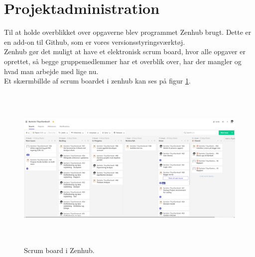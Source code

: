 \section{Projektadministration}
Til at holde overblikket over opgaverne blev programmet Zenhub brugt. Dette er en add-on til Github, som er vores versionsstyringsværktøj. \\
Zenhub gør det muligt at have et elektronisk scrum board, hvor alle opgaver er oprettet, så begge gruppemedlemmer har et overblik over, har der mangler og hvad man arbejde med lige nu. \\
Et skærmbillde af scrum boardet i zenhub kan ses på figur \ref{fig:ZenhubScrum}.

\begin{figure} [H]
	\begin{center}
		\includegraphics[height=8cm, width=15cm]{Projektadministration/Zenhub}
	\end{center}
	\caption{Scrum board i Zenhub.}
	\label{fig:ZenhubScrum}
\end{figure} 
